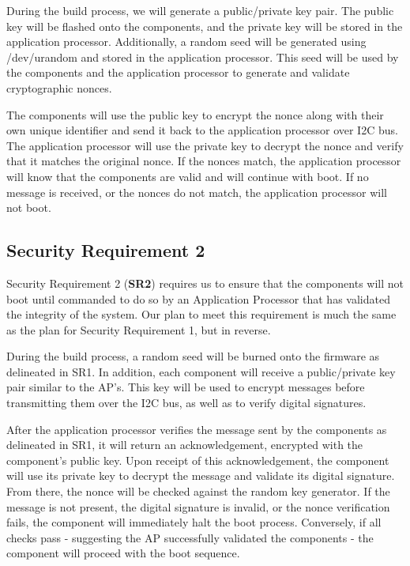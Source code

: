 \documentclass{prace}
\begin{document}
During the build process, we will generate a public/private key pair. The public key will be
flashed onto the components, and the private key will be stored in the application processor.
Additionally, a random seed will be generated using /dev/urandom and stored in the application
processor. This seed will be used by the components and the application processor to generate
and validate cryptographic nonces.

The components will use the public key to encrypt the nonce along with their own
unique identifier and send it back to the application processor over I2C bus. The application
processor will use the private key to decrypt the nonce and verify that it matches the original
nonce. If the nonces match, the application processor will know that the components are valid
and will continue with boot. If no message is received, or the nonces do not match, the application
processor will not boot.

\subsection{Security Requirement 2}
Security Requirement 2 (\textbf{SR2}) requires us to ensure that the components will not boot until commanded
to do so by an Application Processor that has validated the integrity of the system. Our plan to
meet this requirement is much the same as the plan for Security Requirement 1, but in reverse.

During the build process, a random seed will be burned onto the firmware as delineated in 
SR1. In addition, each component will receive a public/private key pair similar to the AP's.
This key will be used to encrypt messages before transmitting them over the I2C bus, as well
as to verify digital signatures.

After the application processor verifies the message sent by the components as delineated
in SR1, it will return an acknowledgement, encrypted with the component's public key. Upon
receipt of this acknowledgement, the component will use its private key to decrypt the 
message and validate its digital signature. From there, the nonce will be checked against
the random key generator. If the message is not present, the digital signature is invalid,
or the nonce verification fails, the component will immediately halt the boot process.
Conversely, if all checks pass - suggesting the AP successfully validated the components -
the component will proceed with the boot sequence.
\end{document}
